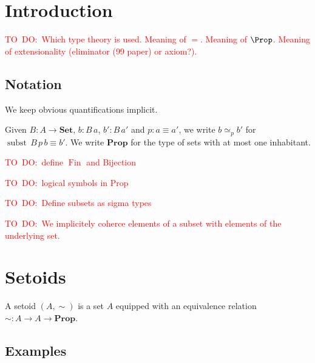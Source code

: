 \documentclass{llncs}
\newcommand{\prop}{\mathbf{Prop}}
\DeclareMathOperator*{\subst}{\mathrm{subst}}
\newcommand{\Set}{\mathbf{Set}}
\DeclareMathOperator*{\Fin}{\mathrm{Fin}}
\newcommand{\todo}[1]{\textcolor{red}{TO~DO:~#1}}
\begin{document}

%






\section{Introduction}\label{sec:introduction}
\todo{Which type theory is used. Meaning of $=$. Meaning of $\Prop$. Meaning of  extensionality (eliminator (99 paper) or axiom?).
}

\subsection{Notation}
We keep obvious quantifications implicit.

Given $B : A \to \Set$, $b : B\,a$, $b' : B\,a'$ and $p : a\equiv a'$, we write $b \simeq_{p} b'$ for $\subst\,B\,p\,b \equiv b'$.
We write $\prop$ for the type of sets with at most one inhabitant.

\todo{define $\Fin$ and Bijection}  

\todo{logical symbols in Prop}

\todo{Define subsets as sigma types}

\todo{We implicitely coherce elements of a subset with elements of the underlying set.}

\section{Setoids}\label{sec:setoids}
\begin{definition}
A setoid $(A,\sim)$ is a set $A$ equipped with an equivalence relation $\sim : A \to A \to \prop$.
\end{definition}
\subsection{Examples}\label{sec:setoids:examples}
\end{document}
